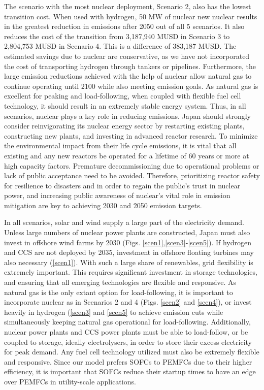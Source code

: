 The scenario with the most nuclear deployment, Scenario 2, also has the lowest transition cost. When used with hydrogen, 50 MW of nuclear new nuclear results in the greatest reduction in emissions after 2050 out of all 5 scenarios. It also reduces the cost of the transition from 3,187,940 MUSD in Scenario 3 to 2,804,753 MUSD in Scenario 4. This is a difference of 383,187 MUSD. The estimated savings due to nuclear are conservative, as we have not incorporated the cost of transporting hydrogen through tankers or pipelines. Furthermore, the large emission reductions achieved with the help of nuclear allow natural gas to continue operating until 2100 while also meeting emission goals. As natural gas is excellent for peaking and load-following, when coupled with flexible fuel cell technology, it should result in an extremely stable energy system. Thus, in all scenarios, nuclear plays a key role in reducing emissions. Japan should strongly consider reinvigorating its nuclear energy sector by restarting existing plants, constructing new plants, and investing in advanced reactor research. To minimize the environmental impact from their life cycle emissions, it is vital that all existing and any new reactors be operated for a lifetime of 60 years or more at high capacity factors. Premature decommissioning due to operational problems or lack of public acceptance need to be avoided. Therefore, prioritizing reactor safety for resilience to disasters and in order to regain the public's trust in nuclear power, and increasing public awareness of nuclear's vital role in emission mitigation are key to achieving 2030 and 2050 emission targets.

In all scenarios, solar and wind supply a large part of the electricity demand. Unless large numbers of nuclear power plants are constructed, Japan must also invest in offshore wind farms by 2030 (Figs. \ref{scen1},\ref{scen3}-\ref{scen5}). If hydrogen and CCS are not deployed by 2035, investment in offshore floating turbines may also necessary (\ref{scen1}). With such a large share of renewables, grid flexibility is extremely important. This requires significant investment in storage technologies, and ensuring that all emerging technologies are flexible and responsive. As natural gas is the only extant option for load-following, it is important to incorporate nuclear as in Scenarios 2 and 4 (Figs. \ref{scen2} and \ref{scen4}), or invest heavily in hydrogen (\ref{scen3} and \ref{scen5} to achieve emission cuts while simultaneously keeping natural gas operational for load-following. Additionally, nuclear power plants and CCS power plants must be able to load-follow, or be coupled to storage, ideally electrolysers, in order to store their excess electricity for peak demand. Any fuel cell technology utilized must also be extremely flexible and responsive. Since our model prefers \gls{SOFC}s to \gls{PEMFC}s due to their higher efficiency, it is important that \gls{SOFC}s reduce their startup times to have an edge over \gls{PEMFC}s in utility-scale applications.

